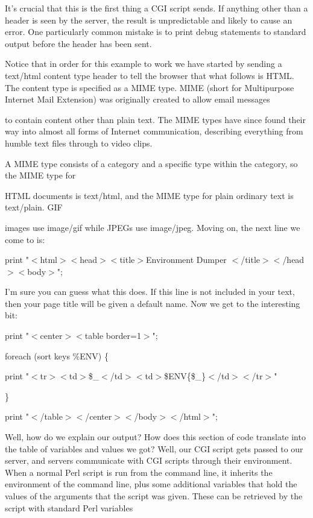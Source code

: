 \documentclass[a4paper,11pt]{book}
\begin{document}
\noindent 

\noindent It's crucial that this is the first thing a CGI script sends. If anything other than a header is seen by the server, the result is unpredictable and likely to cause an error. One particularly common mistake is to print debug statements to standard output before the header has been sent.

\noindent 

\noindent Notice that in order for this example to work we have started by sending a text/html content type header to tell the browser that what follows is HTML. The content type is specified as a MIME type. MIME (short for Multipurpose Internet Mail Extension) was originally created to allow email messages

\noindent to contain content other than plain text. The MIME types have since found their way into almost all forms of Internet communication, describing everything from humble text files through to video clips.

\noindent 

\noindent 

\noindent A MIME type consists of a category and a specific type within the category, so the MIME type for

\noindent HTML documents is text/html, and the MIME type for plain ordinary text is text/plain. GIF

\noindent images use image/gif while JPEGs use image/jpeg. Moving on, the next line we come to is:

\noindent print "$<$html$>$$<$head$>$$<$title$>$Environment Dumper $<$/title$>$$<$/head$>$$<$body$>$";

\noindent 

\noindent I'm sure you can guess what this does. If this line is not included in your text, then your page title will be given a default name. Now we get to the interesting bit:

\noindent 

\noindent print "$<$center$>$$<$table border=1$>$";

\noindent foreach (sort keys \%ENV) \{

\noindent print "$<$tr$>$$<$td$>$\$\_$<$/td$>$$<$td$>$\$ENV\{\$\_\}$<$/td$>$$<$/tr$>$"

\noindent \}

\noindent print "$<$/table$>$$<$/center$>$$<$/body$>$$<$/html$>$";

\noindent 

\noindent Well, how do we explain our output? How does this section of code translate into the table of variables and values we got? Well, our CGI script gets passed to our server, and servers communicate with CGI scripts through their environment. When a normal Perl script is run from the command line, it inherits the environment of the command line, plus some additional variables that hold the values of the arguments that the script was given. These can be retrieved by the script with standard Perl variables
\end{document}
